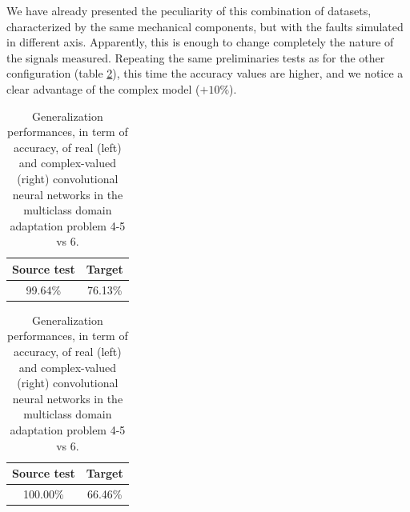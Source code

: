 \documentclass[../main.tex]{subfiles}
\begin{document}
We have already presented the peculiarity of this combination of datasets, characterized by the same mechanical components, but with the faults simulated in different axis. Apparently, this is enough to change completely the nature of the signals measured. Repeating the same preliminaries tests as for the other configuration (table \ref{tab:bonfiglioli_generalization_101_104}), this time the accuracy values are higher, and we notice a clear advantage of the complex model ($+10\%$).
\begin{table}[!ht]
	\centering
	\begin{minipage}{.45\linewidth}
		\begin{tabular}{c c}
			\textbf{Source test} & \textbf{Target}\\
			\midrule
			99.64\% & 76.13\% \\			
		\end{tabular}
	\end{minipage}
	\begin{minipage}{.45\linewidth}
		\begin{tabular}{c c}
			\textbf{Source test} & \textbf{Target}\\
			\midrule
			100.00\% & 66.46\% \\			
		\end{tabular}
	\end{minipage}
	\caption{Generalization performances, in term of accuracy, of real (left) and complex-valued (right) convolutional neural networks in the multiclass domain adaptation problem 4-5 vs 6.}
	\label{tab:bonfiglioli_generalization_101_104}
\end{table}
\end{document}

